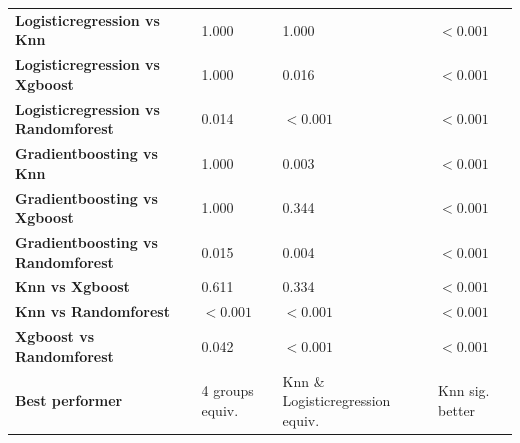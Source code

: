 \begin{table}[H]
{\begin{tabular}{llll}
        \textbf{Logisticregression vs Knn} & 1.000 & 1.000 & $< 0.001$ \\
        \textbf{Logisticregression vs Xgboost} & 1.000 & 0.016 & $< 0.001$ \\
        \textbf{Logisticregression vs Randomforest} & 0.014 & $< 0.001$ & $< 0.001$ \\
        \textbf{Gradientboosting vs Knn} & 1.000 & 0.003 & $< 0.001$ \\
        \textbf{Gradientboosting vs Xgboost} & 1.000 & 0.344 & $< 0.001$ \\
        \textbf{Gradientboosting vs Randomforest} & 0.015 & 0.004 & $< 0.001$ \\
        \textbf{Knn vs Xgboost} & 0.611 & 0.334 & $< 0.001$ \\
        \textbf{Knn vs Randomforest} & $< 0.001$ & $< 0.001$ & $< 0.001$ \\
        \textbf{Xgboost vs Randomforest} & 0.042 & $< 0.001$ & $< 0.001$ \\
        \textbf{Best performer} & 4 groups equiv. & Knn \& Logisticregression equiv. & Knn sig. better \\
        \bottomrule
    \end{tabular}}
\end{table}